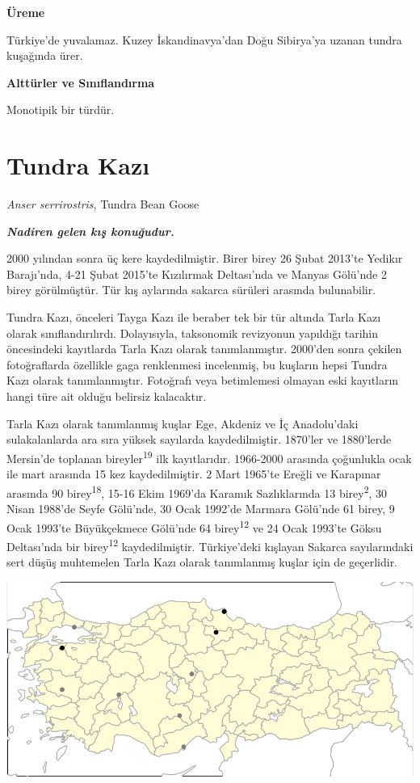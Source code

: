 \documentclass[
  letterpaper,
  DIV=11,
  numbers=noendperiod]{scrreprt}
\begin{document}
\textbf{Üreme}

Türkiye'de yuvalamaz. Kuzey İskandinavya'dan Doğu Sibirya'ya uzanan
tundra kuşağında ürer.

\textbf{Alttürler ve Sınıflandırma}

Monotipik bir türdür.

\section{Tundra Kazı}\label{tundra-kazux131}

\emph{Anser serrirostris}, Tundra Bean Goose

\textbf{\emph{Nadiren gelen kış konuğudur.}}

2000 yılından sonra üç kere kaydedilmiştir. Birer birey 26 Şubat 2013'te
Yedikır Barajı'nda, 4-21 Şubat 2015'te Kızılırmak Deltası'nda ve Manyas
Gölü'nde 2 birey görülmüştür. Tür kış aylarında sakarca sürüleri
arasında bulunabilir.

Tundra Kazı, önceleri Tayga Kazı ile beraber tek bir tür altında Tarla
Kazı olarak sınıflandırılırdı. Dolayısıyla, taksonomik revizyonun
yapıldığı tarihin öncesindeki kayıtlarda Tarla Kazı olarak
tanımlanmıştır. 2000'den sonra çekilen fotoğraflarda özellikle gaga
renklenmesi incelenmiş, bu kuşların hepsi Tundra Kazı olarak
tanımlanmıştır. Fotoğrafı veya betimlemesi olmayan eski kayıtların hangi
türe ait olduğu belirsiz kalacaktır.

Tarla Kazı olarak tanımlanmış kuşlar Ege, Akdeniz ve İç Anadolu'daki
sulakalanlarda ara sıra yüksek sayılarda kaydedilmiştir. 1870'ler ve
1880'lerde Mersin'de toplanan bireyler\textsuperscript{19} ilk
kayıtlarıdır. 1966-2000 arasında çoğunlukla ocak ile mart arasında 15
kez kaydedilmiştir. 2 Mart 1965'te Ereğli ve Karapınar arasında 90
birey\textsuperscript{18}, 15-16 Ekim 1969'da Karamık Sazlıklarında 13
birey\textsuperscript{2}, 30 Nisan 1988'de Seyfe Gölü'nde, 30 Ocak
1992'de Marmara Gölü'nde 61 birey, 9 Ocak 1993'te Büyükçekmece Gölü'nde
64 birey\textsuperscript{12} ve 24 Ocak 1993'te Göksu Deltası'nda bir
birey\textsuperscript{12} kaydedilmiştir. Türkiye'deki kışlayan Sakarca
sayılarındaki sert düşüş muhtemelen Tarla Kazı olarak tanımlanmış kuşlar
için de geçerlidir.

\includegraphics[width=6.25in,height=\textheight]{images/harita_Anser_serrirostris.png}
\end{document}
